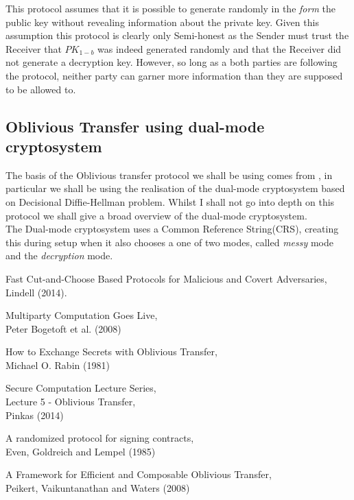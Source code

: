 \documentclass[a4paper,10pt]{article}
\begin{document}
		This protocol assumes that it is possible to generate randomly in the \emph{form} the public key without revealing information about the private key. Given this assumption this protocol is clearly only Semi-honest as the Sender must trust the Receiver that $PK_{1-b}$ was indeed generated randomly and that the Receiver did not generate a decryption key. However, so long as a both parties are following the protocol, neither party can garner more information than they are supposed to be allowed to.

	\subsection{Oblivious Transfer using dual-mode cryptosystem}
		The basis of the Oblivious transfer protocol we shall be using comes from \cite{PVW_OT_2008}, in particular we shall be using the realisation of the dual-mode cryptosystem based on Decisional Diffie-Hellman problem. Whilst I shall not go into depth on this protocol we shall give a broad overview of the dual-mode cryptosystem.\\

		The Dual-mode cryptosystem uses a Common Reference String(CRS), creating this during setup when it also chooses a one of two modes, called \emph{messy} mode and the \emph{decryption} mode. 



\begin{thebibliography}{5}


Fast Cut-and-Choose Based Protocols for Malicious and Covert Adversaries,\\
Lindell (2014).


Multiparty Computation Goes Live,\\
Peter Bogetoft et al. (2008)

How to Exchange Secrets with Oblivious Transfer,\\
Michael O. Rabin (1981)

Secure Computation Lecture Series,\\
Lecture 5 - Oblivious Transfer,\\
Pinkas (2014)

A randomized protocol for signing contracts,\\
Even, Goldreich and Lempel (1985)

A Framework for Efficient and Composable Oblivious Transfer,\\
Peikert, Vaikuntanathan and Waters (2008)



\end{thebibliography}
\end{document}
